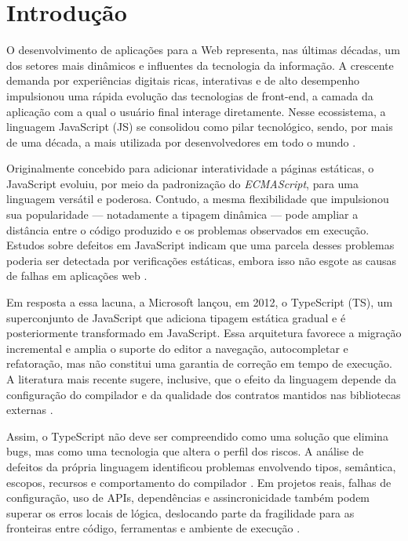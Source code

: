 \chapter{Introdução}

O desenvolvimento de aplicações para a Web representa, nas últimas décadas, um dos setores mais dinâmicos e influentes da tecnologia da informação. A crescente demanda por experiências digitais ricas, interativas e de alto desempenho impulsionou uma rápida evolução das tecnologias de front-end, a camada da aplicação com a qual o usuário final interage diretamente. Nesse ecossistema, a linguagem JavaScript (JS) se consolidou como pilar tecnológico, sendo, por mais de uma década, a mais utilizada por desenvolvedores em todo o mundo \cite{stackoverflow2023}.

Originalmente concebido para adicionar interatividade a páginas estáticas, o JavaScript evoluiu, por meio da padronização do \textit{ECMAScript}, para uma linguagem versátil e poderosa. Contudo, a mesma flexibilidade que impulsionou sua popularidade — notadamente a tipagem dinâmica — pode ampliar a distância entre o código produzido e os problemas observados em execução. Estudos sobre defeitos em JavaScript indicam que uma parcela desses problemas poderia ser detectada por verificações estáticas, embora isso não esgote as causas de falhas em aplicações web \cite{makimov2022,richards2017}.

Em resposta a essa lacuna, a Microsoft lançou, em 2012, o TypeScript (TS), um superconjunto de JavaScript que adiciona tipagem estática gradual e é posteriormente transformado em JavaScript. Essa arquitetura favorece a migração incremental e amplia o suporte do editor a navegação, autocompletar e refatoração, mas não constitui uma garantia de correção em tempo de execução. A literatura mais recente sugere, inclusive, que o efeito da linguagem depende da configuração do compilador e da qualidade dos contratos mantidos nas bibliotecas externas \cite{george2020,zandonotto2026compiler,feldthaus2014interfaces}.

Assim, o TypeScript não deve ser compreendido como uma solução que elimina bugs, mas como uma tecnologia que altera o perfil dos riscos. A análise de defeitos da própria linguagem identificou problemas envolvendo tipos, semântica, escopos, recursos e comportamento do compilador \cite{wang2025bugs}. Em projetos reais, falhas de configuração, uso de APIs, dependências e assincronicidade também podem superar os erros locais de lógica, deslocando parte da fragilidade para as fronteiras entre código, ferramentas e ambiente de execução \cite{tang2026ecosystem}.

